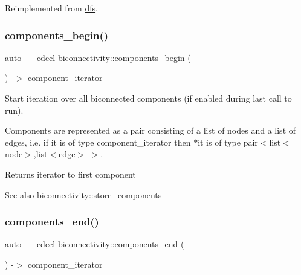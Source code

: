 Reimplemented from \mbox{\hyperlink{classdfs_a1af70060897529e67910f589b047e576}{dfs}}.

\mbox{\label{classbiconnectivity_af0b3daec2b230800ac0bfb9d4671687f}} 
\subsubsection{\texorpdfstring{components\+\_\+begin()}{components\_begin()}}
{\footnotesize\ttfamily auto \+\_\+\+\_\+cdecl biconnectivity\+::components\+\_\+begin (\begin{DoxyParamCaption}{ }\end{DoxyParamCaption}) -\/$>$ component\+\_\+iterator
	\hspace{0.3cm}{\ttfamily [inline]}}



Start iteration over all biconnected components (if enabled during last call to run). 

Components are represented as a pair consisting of a list of nodes and a list of edges, i.\+e. if it is of type component\+\_\+iterator then $\ast$it is of type pair$<$list$<$node$>$,list$<$edge$>$ $>$.

\begin{DoxyReturn}{Returns}
iterator to first component 
\end{DoxyReturn}
\begin{DoxySeeAlso}{See also}
\mbox{\hyperlink{classbiconnectivity_a40e723d97cd42613470ab38baed18c78}{biconnectivity\+::store\+\_\+components}} 
\end{DoxySeeAlso}
\mbox{\label{classbiconnectivity_ac6b38a686d8008f9ec081006bf4a945e}} 
\subsubsection{\texorpdfstring{components\+\_\+end()}{components\_end()}}
{\footnotesize\ttfamily auto \+\_\+\+\_\+cdecl biconnectivity\+::components\+\_\+end (\begin{DoxyParamCaption}{ }\end{DoxyParamCaption}) -\/$>$ component\+\_\+iterator
	\hspace{0.3cm}{\ttfamily [inline]}}



